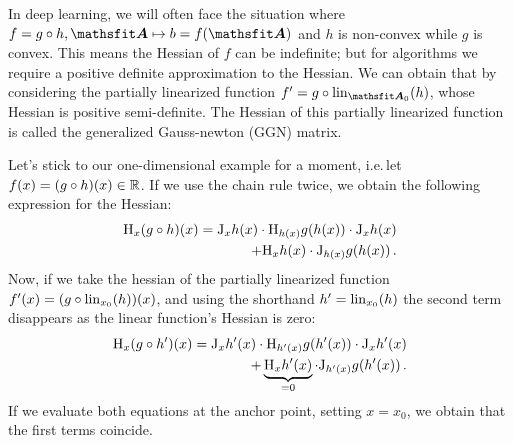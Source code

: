 In deep learning, we will often face the situation where $f = g \circ h, \tA \mapsto b = f(\tA)$ and $h$ is non-convex while $g$ is convex.
This means the Hessian of $f$ can be indefinite; but for algorithms we require a positive definite approximation to the Hessian.
We can obtain that by considering the partially linearized function $f' = g \circ \lin_{\tA_0}(h)$, whose Hessian is positive semi-definite. The Hessian of this partially linearized function is called the generalized Gauss-newton (GGN) matrix.

Let's stick to our one-dimensional example for a moment, i.e.\,let $f(x) = (g \circ h)(x) \in {\mathbb{R}}$. If we use the chain rule twice, we obtain the following expression for the Hessian:
\begin{align*}
  \mathrm{H}_x (g \circ h)(x) =
  \mathrm{J}_x h(x) \cdot \mathrm{H}_{h(x)} g(h(x)) \cdot \mathrm{J}_x h(x)
  \\
  +
  \mathrm{H}_x h(x) \cdot \mathrm{J}_{h(x)} g(h(x))\,.
\end{align*}
Now, if we take the hessian of the partially linearized function $f'(x) = (g \circ \operatorname{lin}_{x_0}(h))(x)$, and using the shorthand $h' = \operatorname{lin}_{x_0}(h)$ the second term disappears as the linear function's Hessian is zero:
\begin{align*}
  \mathrm{H}_x (g \circ h')(x) =
  \mathrm{J}_x h'(x) \cdot \mathrm{H}_{h'(x)} g(h'(x)) \cdot \mathrm{J}_x h'(x)
  \\
  +
  \underbrace{\mathrm{H}_x h'(x)}_{= 0} \cdot \mathrm{J}_{h'(x)} g(h'(x))\,.
\end{align*}
If we evaluate both equations at the anchor point, setting $x = x_0$, we obtain that the first terms coincide.


